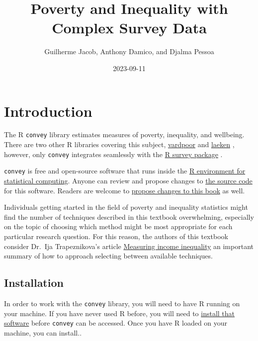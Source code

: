 \documentclass[
]{book}
\title{Poverty and Inequality with Complex Survey Data}
\author{Guilherme Jacob, Anthony Damico, and Djalma Pessoa}
\date{2023-09-11}
\begin{document}
\maketitle

{
\setcounter{tocdepth}{1}
\tableofcontents
}
\hypertarget{introduction}{%
\chapter{Introduction}\label{introduction}}

The R \texttt{convey} library estimates measures of poverty, inequality, and wellbeing. There are two other R libraries covering this subject, \href{https://CRAN.R-project.org/package=vardpoor}{vardpoor} \autocite{R-vardpoor} and \href{https://CRAN.R-project.org/package=laeken}{laeken} \autocite{R-laeken}, however, only \texttt{convey} integrates seamlessly with the \href{https://CRAN.R-project.org/package=survey}{R survey package} \autocite{R-survey-article,R-survey-book,R-survey}.

\texttt{convey} is free and open-source software that runs inside the \href{https://www.r-project.org/}{R environment for statistical computing}. Anyone can review and propose changes to \href{https://github.com/ajdamico/convey}{the source code} for this software. Readers are welcome to \href{https://github.com/guilhermejacob/context/}{propose changes to this book} as well.

Individuals getting started in the field of poverty and inequality statistics might find the number of techniques described in this textbook overwhelming, especially on the topic of choosing which method might be most appropriate for each particular research question. For this reason, the authors of this textbook consider Dr.~Ija Trapeznikova's article \href{https://wol.iza.org/articles/measuring-income-inequality/long}{Measuring income inequality} an important summary of how to approach selecting between available techniques.

\hypertarget{install}{%
\section{Installation}\label{install}}

In order to work with the \texttt{convey} library, you will need to have R running on your machine. If you have never used R before, you will need to \href{https://www.r-project.org/}{install that software} before \texttt{convey} can be accessed. Once you have R loaded on your machine, you can install..
\end{document}
